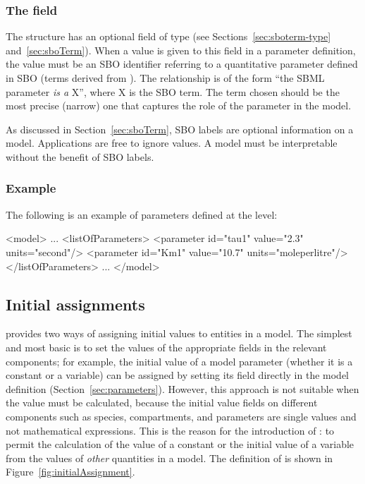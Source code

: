 \subsubsection{The  field}

The \Parameter structure has an optional  field of
type  (see Sections~\ref{sec:sboterm-type}
and~\ref{sec:sboTerm}).  When a value is given to this field in a
parameter definition, the value must be an SBO identifier
referring to a quantitative parameter defined in SBO (\ie terms
derived from \sboparameter).  The relationship is of the form
``the SBML parameter \emph{is a} X'', where X is the SBO term.
The term chosen should be the most precise (narrow) one that
captures the role of the parameter in the model.

As discussed in Section~\ref{sec:sboTerm}, SBO labels are optional
information on a model.  Applications are free to ignore
 values.  A model must be interpretable without the
benefit of SBO labels.


\subsubsection{Example}

The following is an example of parameters defined at the \Model level:

\begin{example}
<model>
    ...
    <listOfParameters>
        <parameter id="tau1" value="2.3" units="second"/>
        <parameter id="Km1" value="10.7" units="moleperlitre"/>
    </listOfParameters>
    ...
</model>
\end{example}



\subsection{Initial assignments}
\label{sec:initialAssignment}

\sbmltwotwo provides two ways of assigning initial values to
entities in a model.  The simplest and most basic is to set the
values of the appropriate  fields in the relevant
components; for example, the initial value of a model parameter
(whether it is a constant or a variable) can be assigned by
setting its  field directly in the model definition
(Section~\ref{sec:parameters}).  However, this approach is not
suitable when the value must be calculated, because the initial
value fields on different components such as species,
compartments, and parameters are single values and not
mathematical expressions.  This is the reason for the introduction
of \InitialAssignment: to permit the calculation of the value of a
constant or the initial value of a variable from the values of
\emph{other} quantities in a model.  The definition of
\InitialAssignment is shown in Figure~\ref{fig:initialAssignment}.

